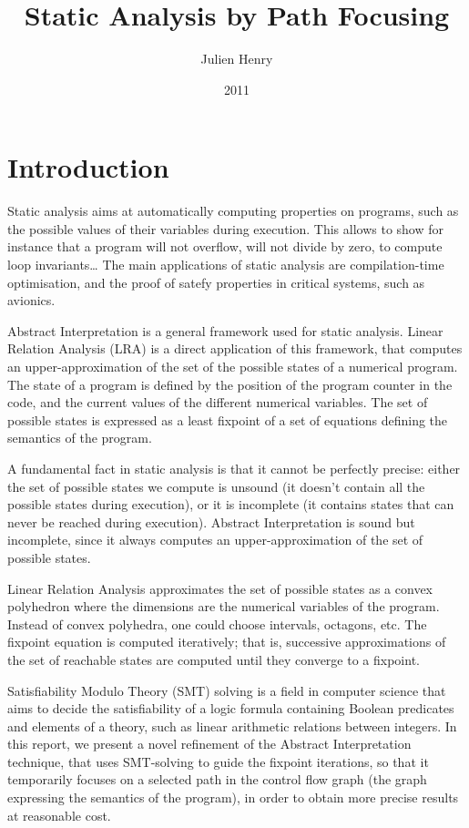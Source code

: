 \documentclass[a4paper,english,titlepage,11pt]{article}
\title{Static Analysis by Path Focusing}
\author{Julien Henry}
\date{2011}
\institute{Grenoble-INP}
\begin{document}
  
  \maketitlepage

  \tableofcontents
  
  \newpage


\section*{Introduction} 

Static analysis aims at automatically computing properties on programs, such as
the possible values of their variables during execution. This allows to show for
instance that a program will not overflow, will not divide by zero, to compute
loop invariants\dots
The main applications of static analysis are compilation-time optimisation, and
the proof of satefy properties in critical systems, such as avionics.

Abstract Interpretation is a general framework used for static analysis.
Linear Relation Analysis (LRA) is a direct application of this framework, that
computes an upper-approximation of the set of the possible states of a numerical
program. The state of a program is defined by the position of the program
counter in the code, and the current values of the different numerical variables.
The set of possible states is expressed as a least fixpoint of a set of
equations defining the semantics of the program. 

A fundamental fact in static analysis is that it cannot be perfectly precise:
either the set of possible states we compute is unsound (it doesn't contain all
the possible states during execution), or it is incomplete (it contains
states that can never be reached during execution). 
Abstract Interpretation is sound but incomplete, since it always computes an
upper-approximation of the set of possible states.

Linear Relation Analysis approximates the set of possible states as a convex
polyhedron where the dimensions are the numerical variables of the program.
Instead of convex polyhedra, one could choose intervals, octagons, etc.
The fixpoint equation is computed iteratively; that is, successive
approximations of the set of reachable states are computed until they converge
to a fixpoint. 

Satisfiability Modulo Theory (SMT) solving is a field in computer science that
aims to decide the satisfiability of a logic formula containing Boolean
predicates and elements of a theory, such as linear arithmetic relations between
integers.
In this report, we present a novel refinement of the Abstract Interpretation
technique, that uses SMT-solving to guide the fixpoint iterations, so that it
temporarily focuses on a selected path in the control flow graph (the graph
expressing the semantics of the program), in order to
obtain more precise results at reasonable cost.
\end{document}
